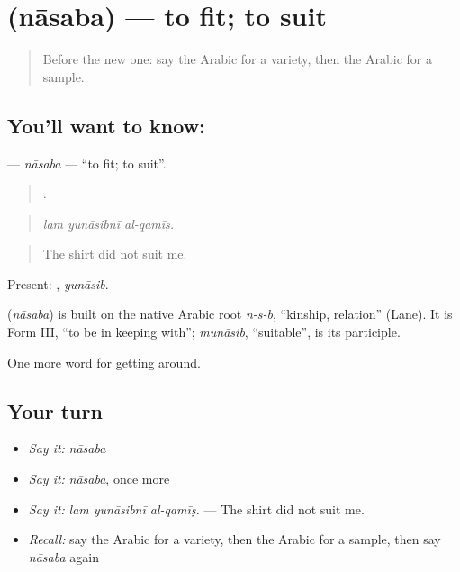 \section[\texorpdfstring{\ar{ناسب} (nāsaba)}{ناسب (nāsaba)}]{ (nāsaba) — to fit; to suit}

\label{lesson:AR-C456-nasaba}



\begin{quote}
Before the new one: say the Arabic for a variety, then the Arabic for a sample.
\end{quote}

\subsection*{You'll want to know: }
\textbf{} — \emph{nāsaba} — \textquotedblleft{}to fit; to suit\textquotedblright{}.

\begin{quote}
  .
\end{quote}

\begin{quote}
\emph{lam yunāsibnī al-qamīṣ.}
\end{quote}

\begin{quote}
The shirt did not suit me.
\end{quote}

Present: , \emph{yunāsib}.

\begin{cousinweb}
\textbf{} (\emph{nāsaba}) is built on the native Arabic root \emph{n-s-b}, \textquotedblleft{}kinship, relation\textquotedblright{} (Lane). It is Form III, \textquotedblleft{}to be in keeping with\textquotedblright{}; \emph{munāsib}, \textquotedblleft{}suitable\textquotedblright{}, is its participle.
\end{cousinweb}

\begin{grammarlens}[title={What you've built}]
One more word for getting around.
\end{grammarlens}

\subsection*{Your turn}
\begin{itemize}
\raggedright
  \item \emph{Say it:} \emph{nāsaba}
  \item \emph{Say it:} \emph{nāsaba}, once more
  \item \emph{Say it:} \emph{lam yunāsibnī al-qamīṣ.} — The shirt did not suit me.
  \item \emph{Recall:} say the Arabic for a variety, then the Arabic for a sample, then say \emph{nāsaba} again
\end{itemize}

